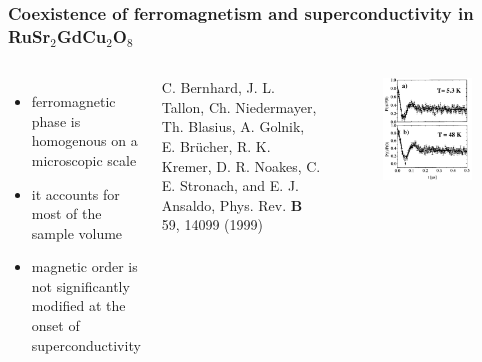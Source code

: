 \begin{frame}
	\frametitle{Coexistence of ferromagnetism and superconductivity in RuSr$_2$GdCu$_2$O$_8$}
	
	\begin{columns}
		\begin{itemize}
			\item ferromagnetic phase is homogenous on a microscopic scale \vspace{10pt}
			\item it accounts for most of the sample volume\vspace{10pt}
			\item magnetic order is not significantly modified at the onset of superconductivity
		\end{itemize}
		\vspace{1cm}
		\vfill
		\setlength{\baselineskip}{6pt}      
		\begin{tiny}
			C. Bernhard, J. L. Tallon, Ch. Niedermayer, Th. Blasius, A. Golnik, E. Brücher, R. K. Kremer, D. R. Noakes, C. E. Stronach, and E. J. Ansaldo, Phys. Rev. \textbf{B} 59, 14099 (1999)
		\end{tiny}
		
		\begin{figure}[htbp]
			\centering
			\includegraphics[width=\textwidth]{Bilder/ferromagnetism.png}%
			\caption*{}%
		\end{figure}
	\end{columns}
	
	\vfill
	
	
\end{frame}
